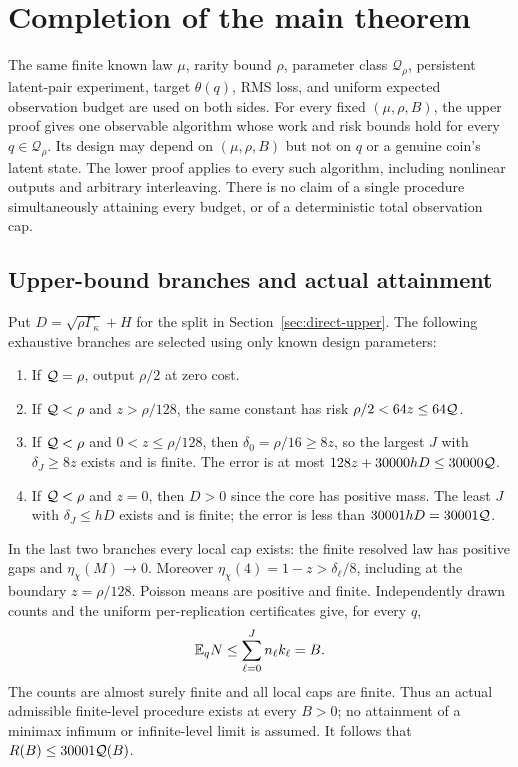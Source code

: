 \section{Completion of the main theorem}\label{sec:assembly-contract}
The same finite known law $\mu$, rarity bound $\rho$, parameter class
$\mathcal Q_\rho$, persistent latent-pair experiment, target $\theta(q)$,
RMS loss, and uniform expected observation budget are used on both sides.
For every fixed $(\mu,\rho,B)$, the upper proof gives one observable
algorithm whose work and risk bounds hold for every $q\in\mathcal Q_\rho$.
Its design may depend on $(\mu,\rho,B)$ but not on $q$ or a genuine
coin's latent state. The lower proof applies to every such algorithm,
including nonlinear outputs and arbitrary interleaving.
There is no claim of a single procedure simultaneously attaining every
budget, or of a deterministic total observation cap.

\subsection{Upper-bound branches and actual attainment}
Put $D=\sqrt{\rho\Gamma_\kappa}+H$ for the split in
Section~\ref{sec:direct-upper}. The following exhaustive branches are
selected using only known design parameters:
\begin{enumerate}
\item If $\mathcal Q=\rho$, output $\rho/2$ at zero cost.
\item If $\mathcal Q<\rho$ and $z>\rho/128$, the same constant has risk
$\rho/2<64z\le64\mathcal Q$.
\item If $\mathcal Q<\rho$ and $0<z\le\rho/128$, then
$\delta_0=\rho/16\ge8z$, so the largest $J$ with $\delta_J\ge8z$
exists and is finite. The error is at most
$128z+30000hD\le30000\mathcal Q$.
\item If $\mathcal Q<\rho$ and $z=0$, then $D>0$ since the core has positive
mass. The least $J$ with $\delta_J\le hD$ exists and is finite;
the error is less than $30001hD=30001\mathcal Q$.
\end{enumerate}
In the last two branches every local cap exists: the finite resolved law
has positive gaps and $\eta_\chi(M)\to0$. Moreover
$\eta_\chi(4)=1-z>\delta_\ell/8$, including at the boundary $z=\rho/128$.
Poisson means are positive and finite. Independently drawn counts and
the uniform per-replication certificates give, for every $q$,
\[
 \mathbb E_qN\le\sum_{\ell=0}^J n_\ell k_\ell=B.
\]
The counts are almost surely finite and all local caps are finite.
Thus an actual admissible finite-level procedure exists at every $B>0$;
no attainment of a minimax infimum or infinite-level limit is assumed.
It follows that $R(B)\le30001\mathcal Q(B)$.

